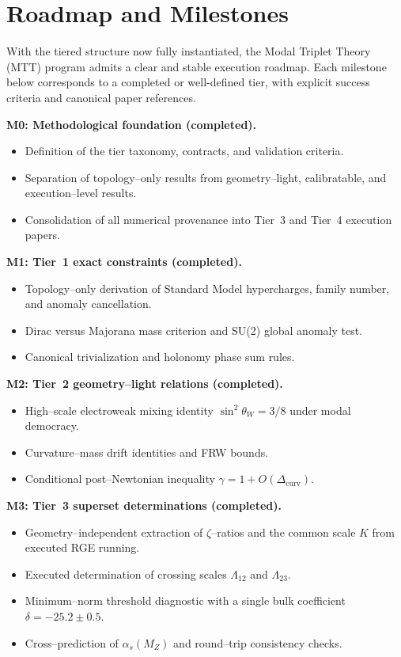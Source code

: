 \documentclass[11pt]{article}
\begin{document}
\section{Roadmap and Milestones}

With the tiered structure now fully instantiated, the Modal Triplet
Theory (MTT) program admits a clear and stable execution roadmap.
Each milestone below corresponds to a completed or well-defined tier,
with explicit success criteria and canonical paper references.

\noindent\textbf{M0: Methodological foundation (completed).}
\begin{itemize}
  \item Definition of the tier taxonomy, contracts, and validation
        criteria.
  \item Separation of topology--only results from geometry--light,
        calibratable, and execution--level results.
  \item Consolidation of all numerical provenance into Tier~3 and
        Tier~4 execution papers.
\end{itemize}

\noindent\textbf{M1: Tier~1 exact constraints (completed).}
\begin{itemize}
  \item Topology--only derivation of Standard Model hypercharges,
        family number, and anomaly cancellation.
  \item Dirac versus Majorana mass criterion and SU(2) global anomaly
        test.
  \item Canonical trivialization and holonomy phase sum rules.
\end{itemize}

\noindent\textbf{M2: Tier~2 geometry--light relations (completed).}
\begin{itemize}
  \item High--scale electroweak mixing identity
        $\sin^2\theta_W=3/8$ under modal democracy.
  \item Curvature--mass drift identities and FRW bounds.
  \item Conditional post--Newtonian inequality
        $\gamma = 1 + O(\Delta_{\mathrm{curv}})$.
\end{itemize}

\noindent\textbf{M3: Tier~3 superset determinations (completed).}
\begin{itemize}
  \item Geometry--independent extraction of $\zeta$--ratios and the
        common scale $K$ from executed RGE running.
  \item Executed determination of crossing scales
        $\Lambda_{12}$ and $\Lambda_{23}$.
  \item Minimum--norm threshold diagnostic with a single bulk
        coefficient $\delta=-25.2\pm0.5$.
  \item Cross--prediction of $\alpha_s(M_Z)$ and round--trip consistency
        checks.
\end{itemize}
\end{document}
